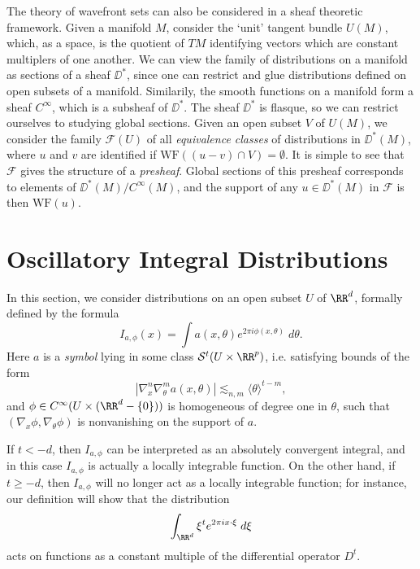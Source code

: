 The theory of wavefront sets can also be considered in a sheaf theoretic framework. Given a manifold $M$, consider the `unit' tangent bundle $U(M)$, which, as a space, is the quotient of $TM$ identifying vectors which are constant multiplers of one another. We can view the family of distributions on a manifold as sections of a sheaf $\DD^*$, since one can restrict and glue distributions defined on open subsets of a manifold. Similarily, the smooth functions on a manifold form a sheaf $C^\infty$, which is a subsheaf of $\DD^*$. The sheaf $\DD^*$ is flasque, so we can restrict ourselves to studying global sections. Given an open subset $V$ of $U(M)$, we consider the family $\mathcal{F}(U)$ of all \emph{equivalence classes} of distributions in $\DD^*(M)$, where $u$ and $v$ are identified if $\text{WF}((u - v) \cap V) = \emptyset$. It is simple to see that $\mathcal{F}$ gives the structure of a \emph{presheaf}. Global sections of this presheaf corresponds to elements of $\DD^*(M) / C^\infty(M)$, and the support of any $u \in \DD^*(M)$ in $\mathcal{F}$ is then $\text{WF}(u)$.

\section{Oscillatory Integral Distributions}

In this section, we consider distributions on an open subset $U$ of $\RR^d$, formally defined by the formula
%
\[ I_{a,\phi}(x) = \int a(x,\theta) e^{2 \pi i \phi(x,\theta)}\; d\theta. \]
%
Here $a$ is a \emph{symbol} lying in some class $\mathcal{S}^t(U \times \RR^p)$, i.e. satisfying bounds of the form
%
\[ |\nabla_x^n \nabla_\theta^m a(x,\theta)| \lesssim_{n,m} \langle \theta \rangle^{t - m}, \]
%
and $\phi \in C^\infty(U \times (\RR^d - \{ 0 \}))$ is homogeneous of degree one in $\theta$, such that $(\nabla_x \phi, \nabla_\theta \phi)$ is nonvanishing on the support of $a$.

If $t < -d$, then $I_{a,\phi}$ can be interpreted as an absolutely convergent integral, and in this case $I_{a,\phi}$ is actually a locally integrable function. On the other hand, if $t \geq -d$, then $I_{a,\phi}$ will no longer act as a locally integrable function; for instance, our definition will show that the distribution
%
\[ \int_{\RR^d} \xi^t e^{2 \pi i x \cdot \xi}\; d\xi \]
%
acts on functions as a constant multiple of the differential operator $D^t$.

